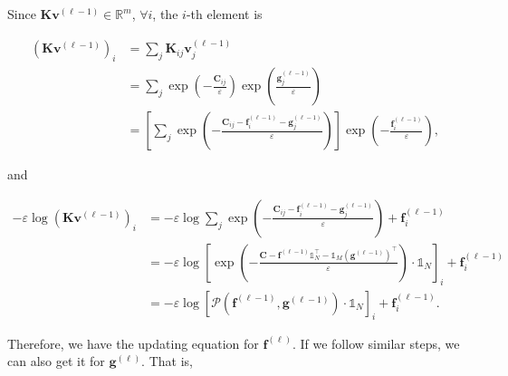 Since $\mathbf{K}\mathbf{v}^{(\ell-1)} \in \mathbb{R}^m$, $\forall i$,
the $i$-th element is %

\begin{equation*}
  \begin{aligned}
    \left(\mathbf{K}\mathbf{v}^{(\ell-1)}\right)_i
     & = \sum_j \mathbf{K}_{ij} \mathbf{v}_j^{(\ell-1)}                                                                      \\
     & = \sum_j \exp(-\frac{\mathbf{C}_{ij}}{\varepsilon}) \exp(\frac{\mathbf{g}_j^{(\ell-1)}}{\varepsilon})                 \\
     & = \left[\sum_j \exp(- \frac{\mathbf{C}_{ij} - \mathbf{f}_i^{(\ell-1)} - \mathbf{g}_j^{(\ell-1)}}{\varepsilon})\right]
    \exp(-\frac{\mathbf{f}_i^{(\ell-1)}}{\varepsilon}),
  \end{aligned}
\end{equation*}

and

\begin{equation*}
  \begin{aligned}
    -\varepsilon\log \left(\mathbf{K} \mathbf{v}^{(\ell-1)}\right)_i
     & =
    -\varepsilon\log \sum_j \exp(- \frac{\mathbf{C}_{ij} - \mathbf{f}_i^{(\ell-1)} - \mathbf{g}_j^{(\ell-1)}}{\varepsilon})
    + \mathbf{f}_i^{(\ell-1)} \\
     & =
    -\varepsilon\log \left[
      \exp \left(
      -\frac{\mathbf{C} - \mathbf{f}^{(\ell-1)} \mathbb{1}_N^\top - \mathbb{1}_M (\mathbf{g}^{(\ell-1)})^\top}{\varepsilon}
      \right)
      \cdot \mathbb{1}_N
      \right]_i
    + \mathbf{f}_i^{(\ell-1)} \\
     & =
    -\varepsilon\log
    \left[
      \mathcal{P} \left(\mathbf{f}^{(\ell-1)}, \mathbf{g}^{(\ell-1)}\right)\cdot \mathbb{1}_N
      \right]_i + \mathbf{f}_i^{(\ell-1)}.
  \end{aligned}
\end{equation*}

Therefore, we have the updating equation for $\mathbf{f}^{(\ell)}$.
If we follow similar steps, we can also get it for $\mathbf{g}^{(\ell)}$.
That is,


